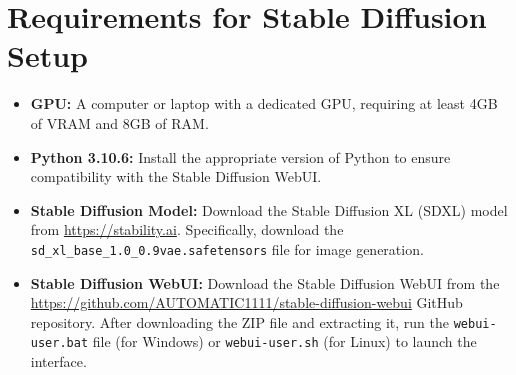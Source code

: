 \documentclass[12pt,DIV14,BCOR12mm,a4paper,footinclude=false,headinclude,parskip=half-,twoside,openright,cleardoublepage=empty,toc=index,bibliography=totoc,listof=totoc]{scrreprt}
\def \doclang{english} 	%
\numberwithin{equation}{chapter}
\begin{document}
\section{Requirements for Stable Diffusion Setup}
\label{appendix:stable_diffusion}
\begin{itemize}
    \item \textbf{GPU:} A computer or laptop with a dedicated GPU, requiring at least 4GB of VRAM and 8GB of RAM.
    \item \textbf{Python 3.10.6:} Install the appropriate version of Python to ensure compatibility with the Stable Diffusion WebUI.
    \item \textbf{Stable Diffusion Model:} Download the Stable Diffusion XL (SDXL) model from \url{https://stability.ai}. Specifically, download the \texttt{sd\_xl\_base\_1.0\_0.9vae.safetensors} file for image generation.
    \item \textbf{Stable Diffusion WebUI:} Download the Stable Diffusion WebUI from the \url{https://github.com/AUTOMATIC1111/stable-diffusion-webui} GitHub repository. After downloading the ZIP file and extracting it, run the \texttt{webui-user.bat} file (for Windows) or \texttt{webui-user.sh} (for Linux) to launch the interface.
\end{itemize}









\listoffigures
\listoftables

\ifthenelse{\equal{\doclang}{german}}{
	
}{
	
}

\end{document}
